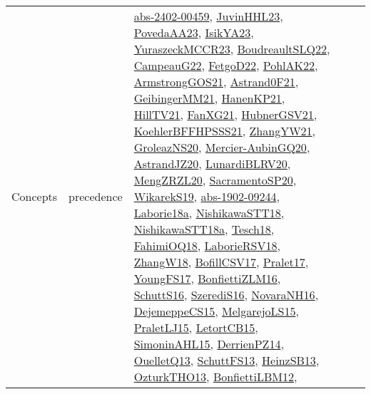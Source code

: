 {\begin{longtable}{lp{3cm}>{\raggedright}p{6cm}>{\raggedright}p{6cm}p{8cm}}
Concepts & precedence & \href{articles/abs-2402-00459.pdf}{abs-2402-00459}\cite{abs-2402-00459}, \href{papers/JuvinHHL23.pdf}{JuvinHHL23}\cite{JuvinHHL23}, \href{papers/PovedaAA23.pdf}{PovedaAA23}\cite{PovedaAA23}, \href{articles/IsikYA23.pdf}{IsikYA23}\cite{IsikYA23}, \href{articles/YuraszeckMCCR23.pdf}{YuraszeckMCCR23}\cite{YuraszeckMCCR23}, \href{papers/BoudreaultSLQ22.pdf}{BoudreaultSLQ22}\cite{BoudreaultSLQ22}, \href{articles/CampeauG22.pdf}{CampeauG22}\cite{CampeauG22}, \href{articles/FetgoD22.pdf}{FetgoD22}\cite{FetgoD22}, \href{articles/PohlAK22.pdf}{PohlAK22}\cite{PohlAK22}, \href{papers/ArmstrongGOS21.pdf}{ArmstrongGOS21}\cite{ArmstrongGOS21}, \href{papers/Astrand0F21.pdf}{Astrand0F21}\cite{Astrand0F21}, \href{papers/GeibingerMM21.pdf}{GeibingerMM21}\cite{GeibingerMM21}, \href{papers/HanenKP21.pdf}{HanenKP21}\cite{HanenKP21}, \href{papers/HillTV21.pdf}{HillTV21}\cite{HillTV21}, \href{articles/FanXG21.pdf}{FanXG21}\cite{FanXG21}, \href{articles/HubnerGSV21.pdf}{HubnerGSV21}\cite{HubnerGSV21}, \href{articles/KoehlerBFFHPSSS21.pdf}{KoehlerBFFHPSSS21}\cite{KoehlerBFFHPSSS21}, \href{articles/ZhangYW21.pdf}{ZhangYW21}\cite{ZhangYW21}, \href{papers/GroleazNS20.pdf}{GroleazNS20}\cite{GroleazNS20}, \href{papers/Mercier-AubinGQ20.pdf}{Mercier-AubinGQ20}\cite{Mercier-AubinGQ20}, \href{articles/AstrandJZ20.pdf}{AstrandJZ20}\cite{AstrandJZ20}, \href{articles/LunardiBLRV20.pdf}{LunardiBLRV20}\cite{LunardiBLRV20}, \href{articles/MengZRZL20.pdf}{MengZRZL20}\cite{MengZRZL20}, \href{articles/SacramentoSP20.pdf}{SacramentoSP20}\cite{SacramentoSP20}, \href{articles/WikarekS19.pdf}{WikarekS19}\cite{WikarekS19}, \href{articles/abs-1902-09244.pdf}{abs-1902-09244}\cite{abs-1902-09244}, \href{papers/Laborie18a.pdf}{Laborie18a}\cite{Laborie18a}, \href{papers/NishikawaSTT18.pdf}{NishikawaSTT18}\cite{NishikawaSTT18}, \href{papers/NishikawaSTT18a.pdf}{NishikawaSTT18a}\cite{NishikawaSTT18a}, \href{papers/Tesch18.pdf}{Tesch18}\cite{Tesch18}, \href{articles/FahimiOQ18.pdf}{FahimiOQ18}\cite{FahimiOQ18}, \href{articles/LaborieRSV18.pdf}{LaborieRSV18}\cite{LaborieRSV18}, \href{articles/ZhangW18.pdf}{ZhangW18}\cite{ZhangW18}, \href{papers/BofillCSV17.pdf}{BofillCSV17}\cite{BofillCSV17}, \href{papers/Pralet17.pdf}{Pralet17}\cite{Pralet17}, \href{papers/YoungFS17.pdf}{YoungFS17}\cite{YoungFS17}, \href{papers/BonfiettiZLM16.pdf}{BonfiettiZLM16}\cite{BonfiettiZLM16}, \href{papers/SchuttS16.pdf}{SchuttS16}\cite{SchuttS16}, \href{papers/SzerediS16.pdf}{SzerediS16}\cite{SzerediS16}, \href{articles/NovaraNH16.pdf}{NovaraNH16}\cite{NovaraNH16}, \href{papers/DejemeppeCS15.pdf}{DejemeppeCS15}\cite{DejemeppeCS15}, \href{papers/MelgarejoLS15.pdf}{MelgarejoLS15}\cite{MelgarejoLS15}, \href{papers/PraletLJ15.pdf}{PraletLJ15}\cite{PraletLJ15}, \href{articles/LetortCB15.pdf}{LetortCB15}\cite{LetortCB15}, \href{articles/SimoninAHL15.pdf}{SimoninAHL15}\cite{SimoninAHL15}, \href{papers/DerrienPZ14.pdf}{DerrienPZ14}\cite{DerrienPZ14}, \href{papers/OuelletQ13.pdf}{OuelletQ13}\cite{OuelletQ13}, \href{papers/SchuttFS13.pdf}{SchuttFS13}\cite{SchuttFS13}, \href{articles/HeinzSB13.pdf}{HeinzSB13}\cite{HeinzSB13}, \href{articles/OzturkTHO13.pdf}{OzturkTHO13}\cite{OzturkTHO13}, \href{papers/BonfiettiLBM12.pdf}{BonfiettiLBM12}\cite{BonfiettiLBM12}, 
\end{longtable}}
